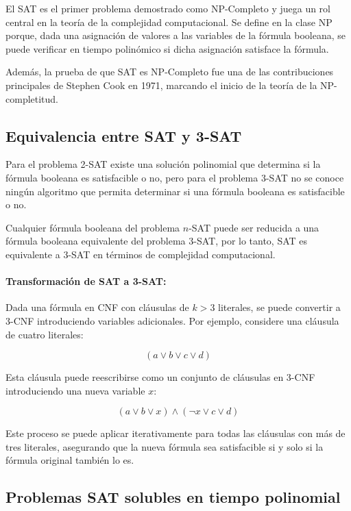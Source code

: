 \documentclass{article}
\begin{document}
El SAT es el primer problema demostrado como NP-Completo \cite{authomataTheory} y juega un rol central en la teoría de la complejidad computacional. Se define en la clase NP porque, dada una asignación de valores a las variables de la fórmula booleana, se puede verificar en tiempo polinómico si dicha asignación satisface la fórmula.

Además, la prueba de que SAT es NP-Completo fue una de las contribuciones principales de Stephen Cook en 1971, marcando el inicio de la teoría de la NP-completitud.

\subsection{Equivalencia entre SAT y 3-SAT}

Para el problema 2-SAT existe una solución polinomial que determina si la fórmula booleana es satisfacible o no, pero para el problema 3-SAT no se conoce ningún algoritmo que permita
determinar si una fórmula booleana es satisfacible o no.

Cualquier fórmula booleana del problema $n$-SAT puede ser reducida a una fórmula booleana equivalente del problema 3-SAT, por lo tanto, SAT es equivalente a 3-SAT en términos de complejidad computacional.

\paragraph{Transformación de SAT a 3-SAT:}

Dada una fórmula en CNF con cláusulas de \( k > 3 \) literales, se puede convertir a 3-CNF introduciendo variables adicionales. Por ejemplo, considere una cláusula de cuatro literales:

\[
      (a \vee b \vee c \vee d)
\]

Esta cláusula puede reescribirse como un conjunto de cláusulas en 3-CNF introduciendo una nueva variable \( x \):

\[
      (a \vee b \vee x) \wedge (\neg x \vee c \vee d)
\]

Este proceso se puede aplicar iterativamente para todas las cláusulas con más de tres literales, asegurando que la nueva fórmula sea satisfacible si y solo si la fórmula original también lo es.

\subsection{Problemas SAT solubles en tiempo polinomial}
\end{document}
